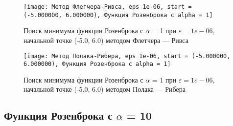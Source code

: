             \begin{figure}[H]
	        \centering
	        \texttt{[image: Метод Флетчера-Ривса, eps 1e-06, start = (-5.000000, 6.000000), Функция Розенброка с alpha = 1]}%
	        \caption{Поиск минимума функции Розенброка с $\alpha$ = 1 при $\varepsilon = 1e-06$, начальной точке (-5.0, 6.0) методом Флетчера --- Ривса}
	        \vspace*{-1.2cm}
            \end{figure}
            
            \begin{figure}[H]
	        \centering
	        \texttt{[image: Метод Полака-Рибера, eps 1e-06, start = (-5.000000, 6.000000), Функция Розенброка с alpha = 1]}%
	        \caption{Поиск минимума функции Розенброка с $\alpha$ = 1 при $\varepsilon = 1e-06$, начальной точке (-5.0, 6.0) методом Полака --- Рибера}
	        \vspace*{-1.2cm}
            \end{figure}
            \subsection{Функция Розенброка с $\alpha$ = 10}

